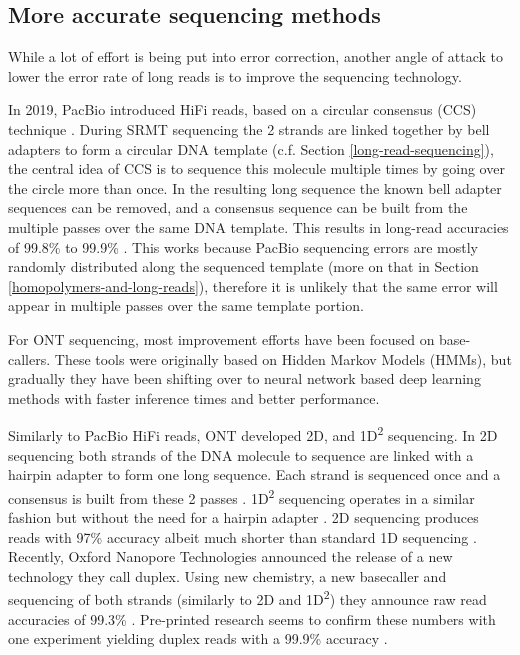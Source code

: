 \documentclass[
  11pt,
  twoside,
  BCOR=10mm,
  listof=totoc]{scrbook}
\begin{document}
\hypertarget{more-accurate-sequencing-methods}{%
\subsection{More accurate sequencing methods}\label{more-accurate-sequencing-methods}}

While a lot of effort is being put into error correction, another angle of attack to lower the error rate of long reads is to improve the sequencing technology.

In 2019, PacBio introduced HiFi reads, based on a circular consensus (CCS) technique \autocite{wenger2019}. During SRMT sequencing the 2 strands are linked together by bell adapters to form a circular DNA template (c.f. Section \ref{long-read-sequencing}), the central idea of CCS is to sequence this molecule multiple times by going over the circle more than once. In the resulting long sequence the known bell adapter sequences can be removed, and a consensus sequence can be built from the multiple passes over the same DNA template. This results in long-read accuracies of 99.8\% to 99.9\% \autocite{wenger2019,logsdonLongreadHumanGenome2020}. This works because PacBio sequencing errors are mostly randomly distributed along the sequenced template (more on that in Section \ref{homopolymers-and-long-reads}), therefore it is unlikely that the same error will appear in multiple passes over the same template portion.

For ONT sequencing, most improvement efforts have been focused on base-callers. These tools were originally based on Hidden Markov Models \autocite{timpDNABaseCallingNanopore2012} (HMMs), but gradually they have been shifting over to neural network based deep learning methods \autocite{peresiniNanoporeBaseCalling2021,bozaDeepNanoDeepRecurrent2017,wickPerformanceNeuralNetwork2019,amarasingheOpportunitiesChallengesLongread2020} with faster inference times and better performance.

Similarly to PacBio HiFi reads, ONT developed 2D, and 1D\textsuperscript{2} sequencing. In 2D sequencing both strands of the DNA molecule to sequence are linked with a hairpin adapter to form one long sequence. Each strand is sequenced once and a consensus is built from these 2 passes \autocite{tylerEvaluationOxfordNanopore2018}. 1D\textsuperscript{2} sequencing operates in a similar fashion but without the need for a hairpin adapter \autocite{linNanoporeTechnologyIts2021}. 2D sequencing produces reads with 97\% accuracy albeit much shorter than standard 1D sequencing \autocite{tylerEvaluationOxfordNanopore2018}. Recently, Oxford Nanopore Technologies announced the release of a new technology they call duplex. Using new chemistry, a new basecaller and sequencing of both strands (similarly to 2D and 1D\textsuperscript{2}) they announce raw read accuracies of 99.3\% \autocite{OxfordNanoporeTech}. Pre-printed research seems to confirm these numbers with one experiment yielding duplex reads with a 99.9\% accuracy \autocite{sandersonComparisonR9Kit102022}.
\end{document}
